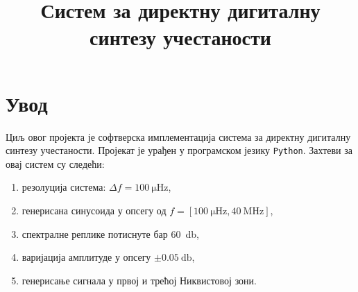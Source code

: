 \documentclass[conference]{IEEEJERM}
\begin{document}
%
\title{Систем за директну дигиталну синтезу учестаности}



\author{
\and
{}
}


\maketitle



\IEEEpeerreviewmaketitle



\section{Увод}

Циљ овог пројекта је софтверска имплементација система за директну дигиталну синтезу учестаности.
Пројекат је урађен у програмском језику \texttt{Python}.
Захтеви за овај систем су следећи:

\begin{enumerate}
	\item резолуција система: $\Delta f = \SI{100}{\micro \hertz}$,
	\item генерисана синусоида  у опсегу од $f = \left[ \SI{100}{\micro \hertz}, \SI{40}{\mega \hertz} \right]$,
	\item спектралне реплике потиснуте бар \SI{60}{\decibel},
	\item варијација амплитуде у опсегу $\pm \SI{0.05}{\decibel}$,
	\item генерисање сигнала у првој и трећој Никвистовој зони.
\end{enumerate}
\end{document}
